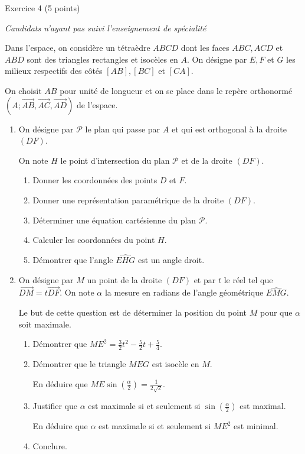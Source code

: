 
%
\begin{h2}Exercice 4 (5 points)\end{h2}
\textit{Candidats n'ayant pas suivi l'enseignement de spécialité}
\par
Dans l'espace, on considère un tétraèdre $ABCD$ dont les faces $ABC, ACD$ et $ABD$ sont des triangles rectangles et isocèles en $A$. On désigne par $E, F$ et $G$ les milieux respectifs des côtés $\left[AB\right], \left[BC\right]$ et $\left[CA\right]$.
\par
On choisit $AB$ pour unité de longueur et on se place dans le repère orthonormé $\left(A ; \overrightarrow{AB}, \overrightarrow{AC}, \overrightarrow{AD}\right)$ de l'espace.
\begin{enumerate}
     \item
     On désigne par $\mathscr P$ le plan qui passe par $A$ et qui est orthogonal à la droite $\left(DF\right)$.
     \par
     On note $H$ le point d'intersection du plan $\mathscr P$ et de la droite $\left(DF\right)$.
     \begin{enumerate}[label=\alph*.]
          \item
          Donner les coordonnées des points $D$ et $F$.
          \item
          Donner une représentation paramétrique de la droite $\left(DF\right)$.
          \item
          Déterminer une équation cartésienne du plan $\mathscr P$.
          \item
          Calculer les coordonnées du point $H$.
          \item
     Démontrer que l'angle $\widehat{EHG}$ est un angle droit.\end{enumerate}
     \item
     On désigne par $M$ un point de la droite $\left(DF\right)$ et par $t$ le réel tel que $\overrightarrow{DM}=t \overrightarrow{DF}$. On note $\alpha $ la mesure en radians de l'angle géométrique $\widehat{EMG}$.
     \par
     Le but de cette question est de déterminer la position du point $M$ pour que $\alpha $ soit maximale.
     \begin{enumerate}[label=\alph*.]
          \item
          Démontrer que $ME^{2}=\frac{3}{2}t^{2}-\frac{5}{2}t+\frac{5}{4}$.
          \item
          Démontrer que le triangle $MEG$ est isocèle en $M$.
          \par
          En déduire que $ME \sin \left(\frac{\alpha }{2}\right)=\frac{1}{2\sqrt{2}}$.
          \item
          Justifier que $\alpha $ est maximale si et seulement si $\sin\left(\frac{\alpha }{2}\right)$ est maximal.
          \par
          En déduire que $\alpha $ est maximale si et seulement si $ME^{2}$ est minimal.
          \item
     Conclure.\end{enumerate}
\end{enumerate}

